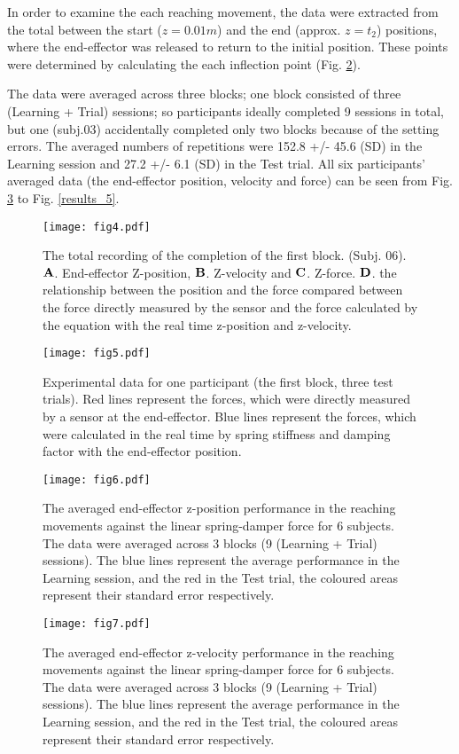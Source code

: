 In order to examine the each reaching movement, the data were extracted from the total between the start ($z = 0.01 m$) and the end (approx. $z = t_2$) positions, where the end-effector was released to return to the initial position. These points were determined by calculating the each inflection point (Fig. \ref{results_2}).

The data were averaged across three blocks; one block consisted of three (Learning + Trial) sessions; so participants ideally completed 9 sessions in total, but one (subj.03) accidentally completed only two blocks because of the setting errors. The averaged numbers of repetitions were 152.8 +/- 45.6 (SD) in the Learning session and 27.2 +/- 6.1 (SD) in the Test trial. All six participants' averaged data (the end-effector position, velocity and force) can be seen from Fig. \ref{results_3} to Fig. \ref{results_5}.
%
\begin{figure}
	\centering
	\texttt{[image: fig4.pdf]}
	\caption{The total recording of the completion of the first block. (Subj. 06). $\mathbf{A}$. End-effector Z-position, $\mathbf{B}$. Z-velocity and $\mathbf{C}$. Z-force. $\mathbf{D}$. the relationship between the position and the force compared between the force directly measured by the sensor and the force calculated by the equation with the real time z-position and z-velocity.}
	\label{results_1}
\end{figure}
%
\begin{figure}
	\centering
	\texttt{[image: fig5.pdf]}
	\caption{Experimental data for one participant (the first block, three test trials). Red lines represent the forces, which were directly measured by a sensor at the end-effector. Blue lines represent the forces, which were calculated in the real time by spring stiffness and damping factor with the end-effector position.}
	\label{results_2}
\end{figure}
%
\begin{figure}
	\centering
	\texttt{[image: fig6.pdf]}
	\caption{The averaged end-effector z-position performance in the reaching movements against the linear spring-damper force for 6 subjects. The data were averaged across 3 blocks (9 (Learning + Trial) sessions). The blue lines represent the average performance in the Learning session, and the red in the Test trial, the coloured areas represent their standard error respectively.}
	\label{results_3}
\end{figure}

\begin{figure}
	\centering
	\texttt{[image: fig7.pdf]}
	\caption{The averaged end-effector z-velocity performance in the reaching movements against the linear spring-damper force for 6 subjects. The data were averaged across 3 blocks (9 (Learning + Trial) sessions). 
		The blue lines represent the average performance in the Learning session, and the red in the Test trial, the coloured areas represent their standard error respectively.}
	\label{results_4}
\end{figure}

